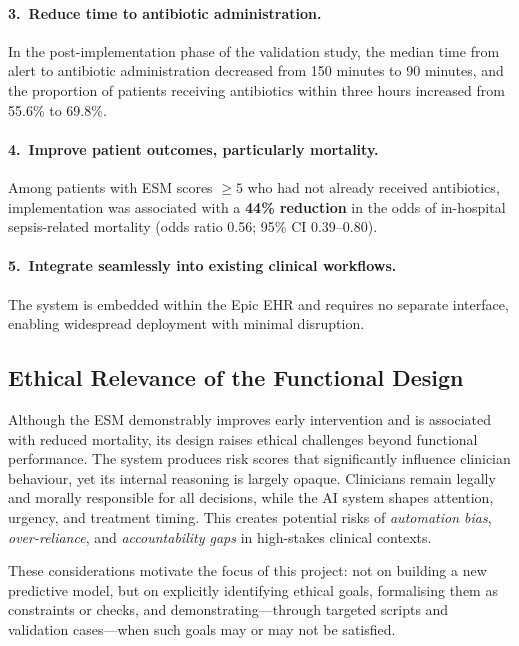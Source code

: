 \documentclass[]{UCD_CS_41820_Report}
\begin{document}
\paragraph{3.\ Reduce time to antibiotic administration.}
In the post-implementation phase of the validation study, the median time from alert
to antibiotic administration decreased from 150 minutes to 90 minutes, and the
proportion of patients receiving antibiotics within three hours increased from 55.6\%
to 69.8\%.

\paragraph{4.\ Improve patient outcomes, particularly mortality.}
Among patients with ESM scores $\geq 5$ who had not already received antibiotics,
implementation was associated with a \textbf{44\% reduction} in the odds of
in-hospital sepsis-related mortality (odds ratio 0.56; 95\% CI 0.39--0.80).

\paragraph{5.\ Integrate seamlessly into existing clinical workflows.}
The system is embedded within the Epic EHR and requires no separate interface,
enabling widespread deployment with minimal disruption.

\subsection*{Ethical Relevance of the Functional Design}

Although the ESM demonstrably improves early intervention and is associated with
reduced mortality, its design raises ethical challenges beyond functional performance.
The system produces risk scores that significantly influence clinician behaviour,
yet its internal reasoning is largely opaque. Clinicians remain legally and morally
responsible for all decisions, while the AI system shapes attention, urgency, and
treatment timing. This creates potential risks of \emph{automation bias},
\emph{over-reliance}, and \emph{accountability gaps} in high-stakes clinical contexts.

These considerations motivate the focus of this project: not on building a new
predictive model, but on explicitly identifying ethical goals, formalising them
as constraints or checks, and demonstrating---through targeted scripts and validation
cases---when such goals may or may not be satisfied.
\end{document}

